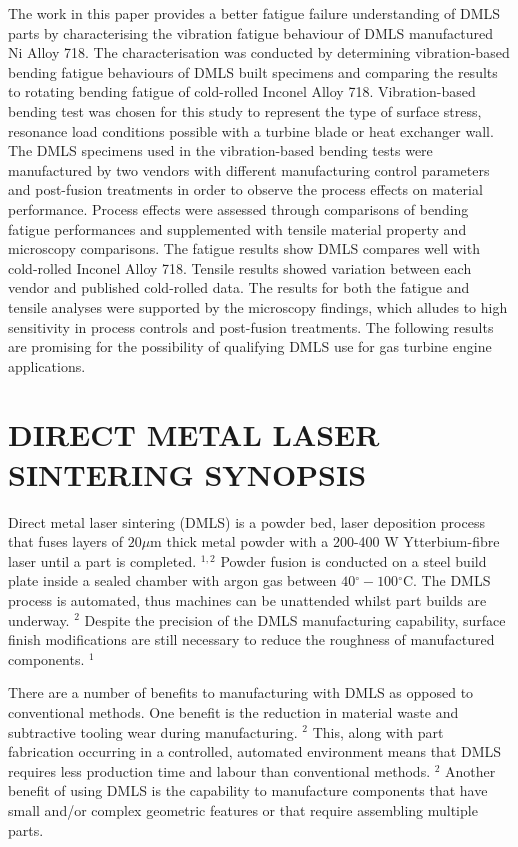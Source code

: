 \documentclass[10pt]{article}
\begin{document}
The work in this paper provides a better fatigue failure understanding of DMLS parts by characterising the vibration fatigue behaviour of DMLS manufactured Ni Alloy 718. The characterisation was conducted by determining vibration-based bending fatigue behaviours of DMLS built specimens and comparing the results to rotating bending fatigue of cold-rolled Inconel Alloy 718. Vibration-based bending test was chosen for this study to represent the type of surface stress, resonance load conditions possible with a turbine blade or heat exchanger wall. The DMLS specimens used in the vibration-based bending tests were manufactured by two vendors with different manufacturing control parameters and post-fusion treatments in order to observe the process effects on material performance. Process effects were assessed through comparisons of bending fatigue performances and supplemented with tensile material property and microscopy comparisons. The fatigue results show DMLS compares well with cold-rolled Inconel Alloy 718. Tensile results showed variation between each vendor and published cold-rolled data. The results for both the fatigue and tensile analyses were supported by the microscopy findings, which alludes to high sensitivity in process controls and post-fusion treatments. The following results are promising for the possibility of qualifying DMLS use for gas turbine engine applications.

\section*{DIRECT METAL LASER SINTERING SYNOPSIS}
Direct metal laser sintering (DMLS) is a powder bed, laser deposition process that fuses layers of $20 \mu \mathrm{m}$ thick metal powder with a 200-400 W Ytterbium-fibre laser until a part is completed. ${ }^{1,2}$ Powder fusion is conducted on a steel build plate inside a sealed chamber with argon gas between $40{ }^{\circ}-100{ }^{\circ} \mathrm{C}$. The DMLS process is automated, thus machines can be unattended whilst part builds are underway. ${ }^{2}$ Despite the precision of the DMLS manufacturing capability, surface finish modifications are still necessary to reduce the roughness of manufactured components. ${ }^{1}$

There are a number of benefits to manufacturing with DMLS as opposed to conventional methods. One benefit is the reduction in material waste and subtractive tooling wear during manufacturing. ${ }^{2}$ This, along with part fabrication occurring in a controlled, automated environment means that DMLS requires less production time and labour than conventional methods. ${ }^{2}$ Another benefit of using DMLS is the capability to manufacture components that have small and/or complex geometric features or that require assembling multiple parts.
\end{document}
